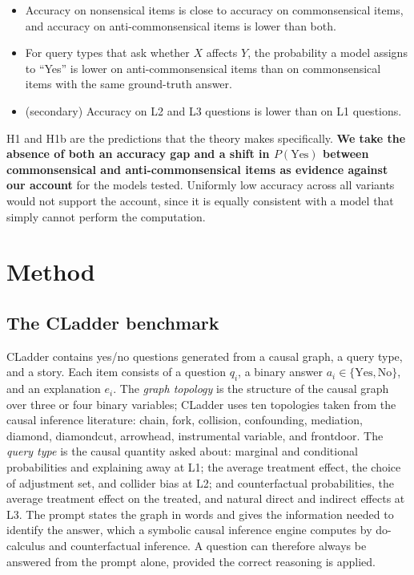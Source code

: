 \documentclass{llncs}
\begin{document}
\begin{itemize}
\item[\textbf{H1}] Accuracy on nonsensical items is close to accuracy on commonsensical items, and accuracy on anti-commonsensical items is lower than both.
\item[\textbf{H1b}] For query types that ask whether $X$ affects $Y$, the probability a model assigns to ``Yes'' is lower on anti-commonsensical items than on commonsensical items with the same ground-truth answer.
\item[\textbf{H2}] (secondary) Accuracy on L2 and L3 questions is lower than on L1 questions.
\end{itemize}

H1 and H1b are the predictions that the theory makes specifically. \textbf{We take the absence of both an accuracy gap and a shift in $P(\text{Yes})$ between commonsensical and anti-commonsensical items as evidence against our account} for the models tested. Uniformly low accuracy across all variants would not support the account, since it is equally consistent with a model that simply cannot perform the computation.

\section{Method}
\label{sec:method}

\subsection{The CLadder benchmark}
\label{sec:cladder}

CLadder \cite{jin2023cladder} contains yes/no questions generated from a causal graph, a query type, and a story. Each item consists of a question $q_i$, a binary answer $a_i \in \{\text{Yes},\text{No}\}$, and an explanation $e_i$. The \emph{graph topology} is the structure of the causal graph over three or four binary variables; CLadder uses ten topologies taken from the causal inference literature: chain, fork, collision, confounding, mediation, diamond, diamondcut, arrowhead, instrumental variable, and frontdoor. The \emph{query type} is the causal quantity asked about: marginal and conditional probabilities and explaining away at L1; the average treatment effect, the choice of adjustment set, and collider bias at L2; and counterfactual probabilities, the average treatment effect on the treated, and natural direct and indirect effects at L3. The prompt states the graph in words and gives the information needed to identify the answer, which a symbolic causal inference engine computes by do-calculus and counterfactual inference. A question can therefore always be answered from the prompt alone, provided the correct reasoning is applied. 
\end{document}

